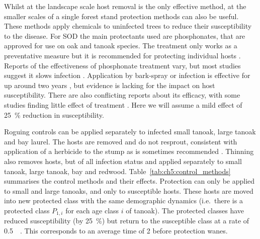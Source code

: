 Whilst at the landscape scale host removal is the only effective method, at the smaller scales of a single forest stand protection methods can also be useful. These methods apply chemicals to uninfected trees to reduce their susceptibility to the disease. For SOD the main protectants used are phosphonates, that are approved for use on oak and tanoak species. The treatment only works as a preventative measure but it is recommended for protecting individual hosts \citep{lee_protecting_2010}. Reports of the effectiveness of phosphonate treatment vary, but most studies suggest it slows infection \citep{swiecki_reference_2013}. Application by bark-spray or infection is effective for up around two years \citep{garbelotto_phosphonate_2009}, but evidence is lacking for the impact on host susceptibility. There are also conflicting reports about its efficacy, with some studies finding little effect of treatment \citep{kanaskie_application_2011}. Here we will assume a mild effect of \SI{25}{\percent} reduction in susceptibility.

Roguing controls can be applied separately to infected small tanoak, large tanoak and bay laurel. The hosts are removed and do not resprout, consistent with application of a herbicide to the stump as is sometimes recommended \citep{swiecki_reference_2013}. Thinning also removes hosts, but of all infection status and applied separately to small tanoak, large tanoak, bay and redwood. Table~\ref{tab:ch5:control_methods} summarises the control methods and their effects. Protection can only be applied to small and large tanoaks, and only to susceptible hosts. These hosts are moved into new protected class with the same demographic dynamics (i.e.\ there is a protected class $P_{1,i}$ for each age class $i$ of tanoak). The protected classes have reduced susceptibility (by \SI{25}{\percent}) but return to the susceptible class at a rate of \SI{0.5}{\per\year}. This corresponds to an average time of \SI{2}{\years} before protection wanes.


